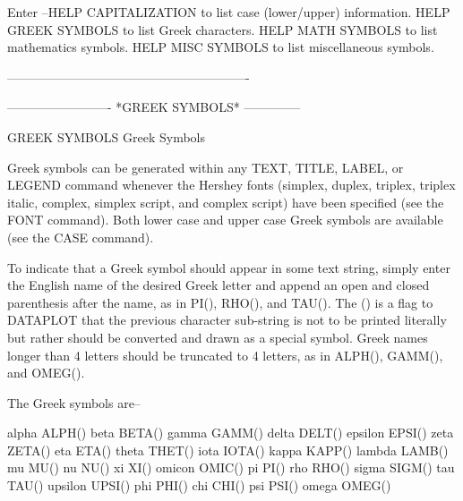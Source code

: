 Enter   --HELP CAPITALIZATION to list case (lower/upper) information.
          HELP GREEK SYMBOLS to list Greek characters.
          HELP MATH SYMBOLS to list mathematics symbols.
          HELP MISC SYMBOLS to list miscellaneous symbols.
 
----------------------------------------------------------
 
 
 
 
 
 
 
 
 
 
 
 
 
 
 
 
 
 
 
 
 
 
 
 
 
 
 
 
 
 
 
 
 
 
 
 
 
 
 
 
 
 
 
 
 
 
 
 
 
-------------------------  *GREEK SYMBOLS*  --------------
 
GREEK SYMBOLS
Greek Symbols
 
Greek symbols can be generated within any TEXT, TITLE, LABEL, or LEGEND
command whenever the Hershey fonts (simplex, duplex, triplex, triplex
italic, complex, simplex script, and complex script) have been
specified (see the FONT command).  Both lower case and upper case Greek
symbols are available (see the CASE command).
 
To indicate that a Greek symbol should appear in some text string,
simply enter the English name of the desired Greek letter and append an
open and closed parenthesis after the name, as in PI(), RHO(), and
TAU().  The () is a flag to DATAPLOT that the previous character
sub-string is not to be printed literally but rather should be
converted and drawn as a special symbol.  Greek names longer than 4
letters should be truncated to 4 letters, as in ALPH(), GAMM(), and
OMEG().
 
The Greek symbols are--
 
   alpha          ALPH()
   beta           BETA()
   gamma          GAMM()
   delta          DELT()
   epsilon        EPSI()
   zeta           ZETA()
   eta            ETA()
   theta          THET()
   iota           IOTA()
   kappa          KAPP()
   lambda         LAMB()
   mu             MU()
   nu             NU()
   xi             XI()
   omicon         OMIC()
   pi             PI()
   rho            RHO()
   sigma          SIGM()
   tau            TAU()
   upsilon        UPSI()
   phi            PHI()
   chi            CHI()
   psi            PSI()
   omega          OMEG()
 
